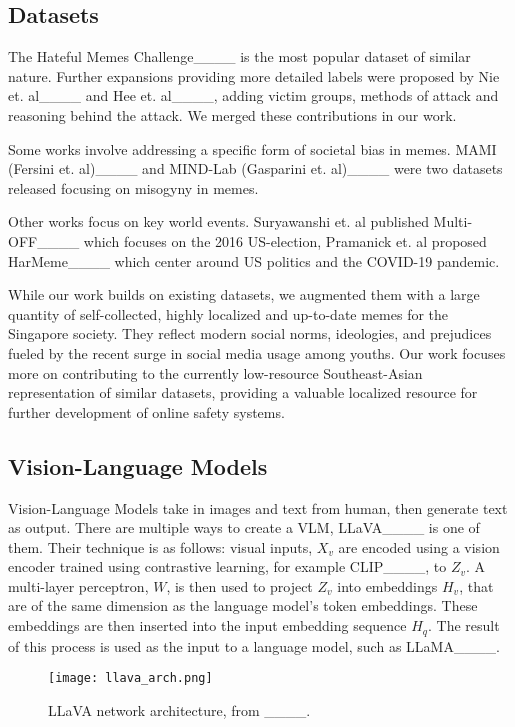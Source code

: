 \subsection{Datasets}
The Hateful Memes Challenge____ is the most popular dataset of similar nature. Further expansions providing more detailed labels were proposed by Nie et. al____ and Hee et. al____, adding victim groups, methods of attack and reasoning behind the attack. We merged these contributions in our work.
\\
\par
Some works involve addressing a specific form of societal bias in memes. MAMI (Fersini et. al)____ and MIND-Lab (Gasparini et. al)____ were two datasets released focusing on misogyny in memes.
\\
\par
Other works focus on key world events. Suryawanshi et. al published Multi-OFF____ which focuses on the 2016 US-election, Pramanick et. al proposed HarMeme____ which center around US politics and the COVID-19 pandemic.
\\
\par
While our work builds on existing datasets, we augmented them with a large quantity of self-collected, highly localized and up-to-date memes for the Singapore society. They reflect modern social norms, ideologies, and prejudices fueled by the recent surge in social media usage among youths. Our work focuses more on contributing to the currently low-resource Southeast-Asian representation of similar datasets, providing a valuable localized resource for further development of online safety systems.

\subsection{Vision-Language Models}
Vision-Language Models take in images and text from human, then generate text as output. There are multiple ways to create a VLM, LLaVA____ is one of them. Their technique is as follows: visual inputs, $X_v$ are encoded using a vision encoder trained using contrastive learning, for example CLIP____, to $Z_v$. A multi-layer perceptron, $W$, is then used to project $Z_v$ into embeddings $H_v$, that are of the same dimension as the language model's token embeddings. These embeddings are then inserted into the input embedding sequence $H_q$. The result of this process is used as the input to a language model, such as LLaMA____.

\begin{figure}[!h]
  \centering
  \texttt{[image: llava\_arch.png]}
  \caption{LLaVA network architecture, from ____.}
\end{figure}

